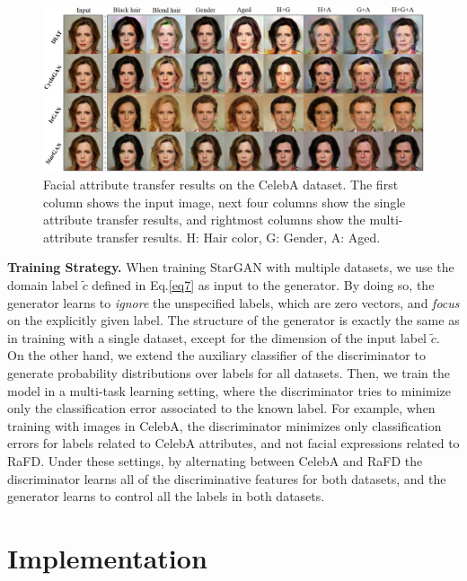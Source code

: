 \documentclass[10pt,twocolumn,letterpaper]{article}
\begin{document}
\medskip

\begin{figure}[ht]
\centering 
\centerline{\includegraphics[width=1.0\linewidth]{images/figure4.jpg}}
\caption{Facial attribute transfer results on the CelebA dataset. The first column shows the input image, next four columns show the single attribute transfer results, and rightmost columns show the multi-attribute transfer results. H: Hair color, G: Gender, A: Aged.}
\label{qual_celeb}

\end{figure}


\noindent\textbf{Training Strategy.} When training StarGAN with multiple datasets, we use the domain label $\tilde{c}$ defined in Eq.\thinspace\eqref{eq7} as input to the generator. By doing so, the generator learns to \textit{ignore} the unspecified labels, which are zero vectors, and \textit{focus} on the explicitly given label. The structure of the generator is exactly the same as in training with a single dataset, except for the dimension of the input label $\tilde{c}$. On the other hand, we extend the auxiliary classifier of the discriminator to generate probability distributions over labels for all datasets. Then, we train the model in a multi-task learning setting, where the discriminator tries to minimize only the classification error associated to the known label. For example, when training with images in CelebA, the discriminator minimizes only classification errors for labels related to CelebA attributes, and not facial expressions related to RaFD. Under these settings, by alternating between CelebA and RaFD the discriminator learns all of the discriminative features for both datasets, and the generator learns to control all the labels in both datasets. 

\section{Implementation} \label{implementation}
\end{document}
